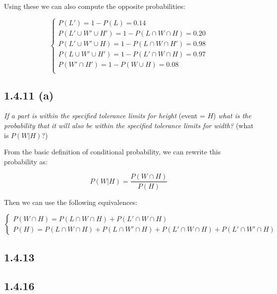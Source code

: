 \documentclass{article}
\begin{document}
Using these we can also compute the opposite probabilities:

\[
\begin{cases}
P(L') = 1 - P(L) = 0.14 \\
P(L'\cup W'\cup H') = 1 - P(L\cap W\cap H) = 0.20 \\
P(L'\cup W'\cup H) = 1 - P(L\cap W\cap H') = 0.98 \\
P(L\cup W'\cup H') = 1 - P(L'\cap W\cap H) = 0.97 \\
P(W'\cap H') = 1 - P(W\cup H) = 0.08 \\
\end{cases}
\]

\subsection*{1.4.11 (a)}

\textit{If a part is within the specified tolerance limits for height}
(event = $H$)
\textit{what is the probability that it will also be within the specified tolerance limits for width?}
(what is $P(W|H)$?)

From the basic definition of conditional probability, we can rewrite
this probability as:

\[
P(W|H) = \frac{P(W\cap H)}{P(H)}
\]

Then we can use the following equivalences:

\[
\begin{cases}
P(W\cap H) = P(L\cap W\cap H) + P(L'\cap W\cap H) \\
P(H) = P(L\cap W\cap H) + P(L\cap W'\cap H) + P(L'\cap W\cap H) + P(L'\cap W'\cap H)
\end{cases}
\]





\subsection*{1.4.13}



\subsection*{1.4.16}
\end{document}
